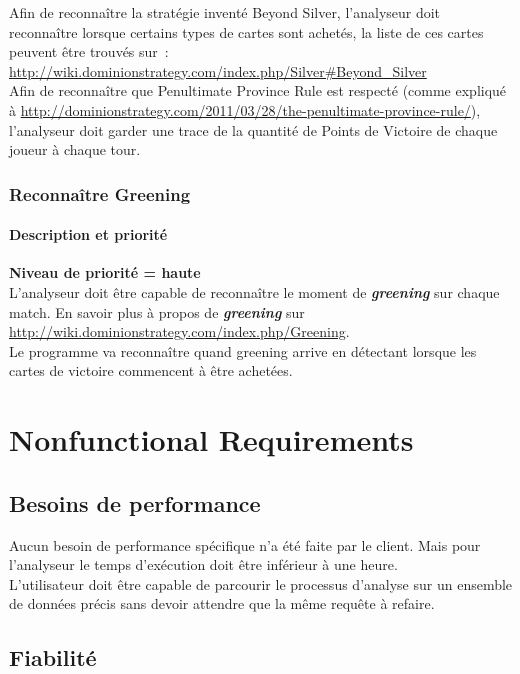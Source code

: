 \documentclass{scrreprt}
\begin{document}
Afin de reconnaître la stratégie inventé Beyond Silver, l'analyseur doit reconnaître lorsque certains types de cartes sont achetés, la liste de ces cartes peuvent être trouvés sur : \url{http://wiki.dominionstrategy.com/index.php/Silver#Beyond_Silver}\\

Afin de reconnaître que Penultimate Province Rule est respecté (comme expliqué à \url{http://dominionstrategy.com/2011/03/28/the-penultimate-province-rule/}), l’analyseur doit garder une trace de la quantité de Points de Victoire de chaque joueur à chaque tour.

\subsection{Reconnaître Greening}
\subsubsection{Description et priorité}
\textbf{Niveau de priorité = haute}\\

L'analyseur doit être capable de reconnaître le moment de \textit{\textbf{greening}} sur chaque match.
En savoir plus à propos de \textit{\textbf{greening}} sur \url{http://wiki.dominionstrategy.com/index.php/Greening}.\\
Le programme va reconnaître quand greening arrive en détectant lorsque les cartes de victoire commencent à être achetées.

\chapter{Nonfunctional Requirements}
\section{Besoins de performance}

Aucun besoin de performance spécifique n’a été faite par le client. Mais pour l'analyseur le temps d’exécution  doit être inférieur à une heure.\\
L'utilisateur doit être capable de parcourir le processus d'analyse sur un ensemble de données précis sans devoir attendre que la même requête à refaire.

\section{Fiabilité}
\end{document}
